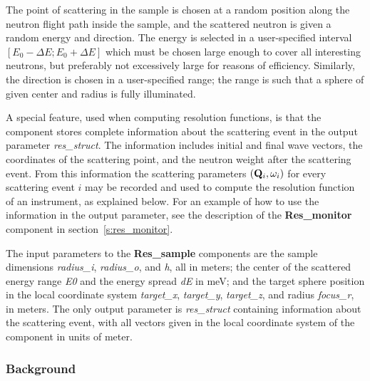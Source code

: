 The point of scattering in the sample is chosen at a random position
along the neutron flight path inside the sample, and the scattered
neutron is given a random energy and direction. The energy is selected in
a user-specified interval $[E_0-\Delta E; E_0+\Delta E]$ which must be
chosen large enough to cover all interesting neutrons, but preferably
not excessively large for reasons of efficiency. Similarly, the
direction is chosen in a user-specified range; the range is such that a
sphere of given center and radius is fully illuminated.

A special feature, used when computing resolution functions, is that the
component stores complete information about the scattering event in the
output parameter \textit{res\_struct}. The information includes initial
and final wave vectors, the coordinates of the scattering point, and the
neutron weight after the scattering event. From this information the
scattering parameters $({\bf Q}_i, \omega_i)$ for every scattering event
$i$ may be recorded and used to compute the resolution function of an
instrument, as explained below. For an example of how to use the
information in the output parameter, see the description of the
\textbf{Res\_monitor} component in section~\ref{s:res_monitor}.

The input parameters to the \textbf{Res\_sample} components are the
sample dimensions \textit{radius\_i}, \textit{radius\_o}, and
\textit{h}, all in meters; the center of the scattered energy range
\textit{E0} and the energy spread \textit{dE} in meV; and the target
sphere position in the local coordinate system \textit{target\_x},
\textit{target\_y}, \textit{target\_z}, and radius \textit{focus\_r}, in
meters. The only output parameter is \textit{res\_struct} containing
information about the scattering event, with all vectors given in the
local coordinate system of the component in units of meter.

\subsubsection{Background}

